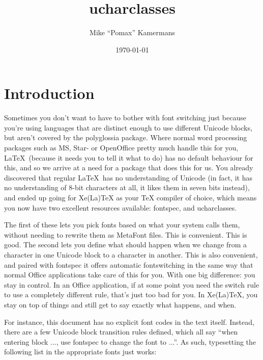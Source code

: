 \documentclass{article}
\begin{document}
	\title{ucharclasses}
	\author{Mike “Pomax” Kamermans}
	\date{\today}
	\maketitle

	\tableofcontents

	\pagebreak

	\section{Introduction}

		Sometimes you don't want to have to bother with font switching just because you're using languages that are distinct enough to use different Unicode blocks, but aren't covered by the polyglossia package. Where normal word processing packages such as MS, Star- or OpenOffice pretty much handle this for you, \LaTeX\ (because it needs you to tell it what to do) has no default behaviour for this, and so we arrive at a need for a package that does this for us. You already discovered that regular \LaTeX\ has no understanding of Unicode (in fact, it has no understanding of 8-bit characters at all, it likes them in seven bits instead), and ended up going for Xe(La)TeX as your TeX compiler of choice, which means you now have two excellent resources available: fontspec, and ucharclasses.

		The first of these lets you pick fonts based on what your system calls them, without needing to rewrite them as MetaFont files. This is convenient. This is good. The second lets you define what should happen when we change from a character in one Unicode block to a character in another. This is also convenient, and paired with fontspec it offers automatic fontswitching in the same way that normal Office applications take care of this for you. With one big difference: you stay in control. In an Office application, if at some point you need the switch rule to use a completely different rule, that's just too bad for you. In Xe(La)TeX, you stay on top of things and still get to say exactly what happens, and when.

		For instance, this document has no explicit font codes in the text itself. Instead, there are a few Unicode block transition rules defined, which all say “when entering block ..., use fontspec to change the font to ...”. As such, typesetting the following list in the appropriate fonts just works:
\end{document}
